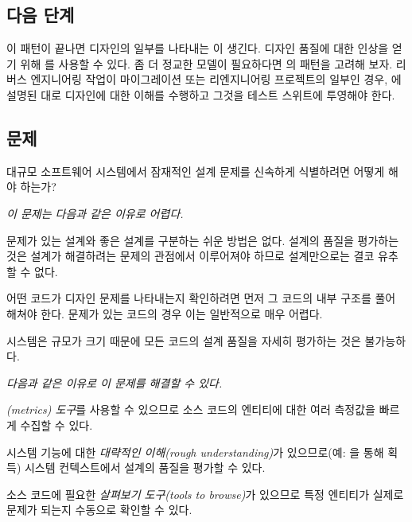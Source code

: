 \documentclass[a4paper,10pt,twoside]{book}
\begin{document}
\subsection*{다음 단계}

이 패턴이 끝나면 디자인의 일부를 나타내는 이 생긴다. 디자인 품질에 대한 인상을 얻기 위해 를 사용할 수 있다. 좀 더 정교한 모델이 필요하다면 의 패턴을 고려해 보자. 리버스 엔지니어링 작업이 마이그레이션 또는 리엔지니어링 프로젝트의 일부인 경우, 에 설명된 대로 디자인에 대한 이해를 수행하고 그것을 테스트 스위트에 투영해야 한다.



\subsection*{문제}

대규모 소프트웨어 시스템에서 잠재적인 설계 문제를 신속하게 식별하려면 어떻게 해야 하는가?

\emph{이 문제는 다음과 같은 이유로 어렵다.}

\begin{bulletlist}
\item 문제가 있는 설계와 좋은 설계를 구분하는 쉬운 방법은 없다. 설계의 품질을 평가하는 것은 설계가 해결하려는 문제의 관점에서 이루어져야 하므로 설계만으로는 결코 유추할 수 없다.

\item 어떤 코드가 디자인 문제를 나타내는지 확인하려면 먼저 그 코드의 내부 구조를 풀어 해쳐야 한다. 문제가 있는 코드의 경우 이는 일반적으로 매우 어렵다.

\item 시스템은 규모가 크기 때문에 모든 코드의 설계 품질을 자세히 평가하는 것은 불가능하다.
\end{bulletlist}

\emph{다음과 같은 이유로 이 문제를 해결할 수 있다.}

\begin{bulletlist}
\item \emph{(metrics) 도구}를 사용할 수 있으므로 소스 코드의 엔티티에 대한 여러 측정값을 빠르게 수집할 수 있다.

\item 시스템 기능에 대한 \emph{대략적인 이해(rough understanding)}가 있으므로(예: 을 통해 획득) 시스템 컨텍스트에서 설계의 품질을 평가할 수 있다.

\item 소스 코드에 필요한 \emph{살펴보기 도구(tools to browse)}가 있으므로 특정 엔티티가 실제로 문제가 되는지 수동으로 확인할 수 있다.
\end{bulletlist}
\end{document}

